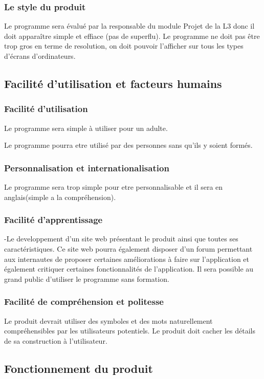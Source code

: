 \documentclass[a4]{article}
\begin{document}
			\subsubsection {Le style du produit}
				Le programme sera évalué par la responsable du module Projet de la L3 donc il doit apparaître 					simple et effiace (pas de superflu).
				Le programme ne doit pas être trop gros en terme de resolution, on doit pouvoir l'afficher sur 					tous les types d'écrans d'ordinateurs.

		\subsection{Facilité d’utilisation et facteurs humains}
			\subsubsection {Facilité d'utilisation}
				Le programme sera simple à utiliser pour un adulte.

				Le programme pourra etre utilisé par des personnes sans qu'ils y soient formés.
			\subsubsection {Personnalisation et internationalisation}
				Le programme sera trop simple pour etre personnalisable et il sera en anglais(simple a la 					compréhension).
			\subsubsection {Facilité d'apprentissage}
				-Le developpement d'un site web présentant le produit ainsi que toutes ses caractéristiques. 				Ce site web pourra également disposer d'un forum permettant aux internautes de proposer certaines 				améliorations à faire sur l'application et également critiquer certaines fonctionnalités de 					l'application.
				Il sera possible au grand public d’utiliser le programme sans formation.
			\subsubsection {Facilité de compréhension et politesse}
				Le produit devrait utiliser des symboles et des mots naturellement compréhensibles par les
				utilisateurs potentiels.
				Le produit doit cacher les détails de sa construction à l’utilisateur.

		\subsection{Fonctionnement du produit}
\end{document}

